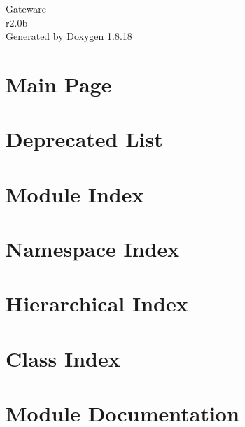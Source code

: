 \let\mypdfximage\pdfximage\def\pdfximage{\immediate\mypdfximage}\documentclass[twoside]{book}
\newcommand{\+}{\discretionary{\mbox{\scriptsize$\hookleftarrow$}}{}{}}
\newcommand{\clearemptydoublepage}{%
  \newpage{\pagestyle{empty}\cleardoublepage}%
}
\begin{document}
\hypersetup{pageanchor=false,
             bookmarksnumbered=true,
             pdfencoding=unicode
            }
\begin{titlepage}
\vspace*{7cm}
\begin{center}%
{\Large Gateware \\[1ex]\large r2.\+0b }\\
\vspace*{1cm}
{\large Generated by Doxygen 1.8.18}\\
\end{center}
\end{titlepage}
\clearemptydoublepage
{}
\tableofcontents
\clearemptydoublepage
{}
\hypersetup{pageanchor=true}

\chapter{Main Page}
\label{index}\hypertarget{index}{}
\chapter{Deprecated List}
\label{deprecated}

\chapter{Module Index}

\chapter{Namespace Index}

\chapter{Hierarchical Index}

\chapter{Class Index}

\chapter{Module Documentation}








\end{document}
